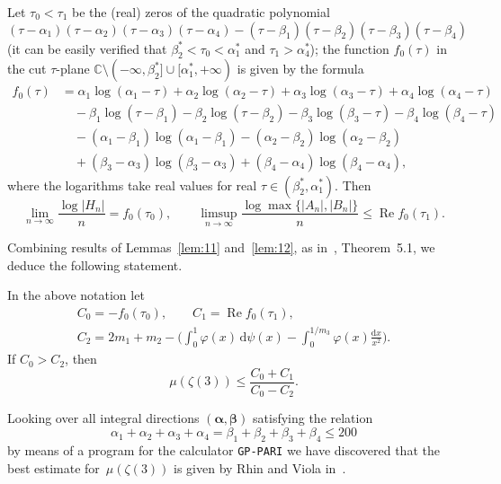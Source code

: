 \documentclass[a4paper,twoside]{article}
\numberwithin{equation}{section}
\renewcommand{\[}{\lfloor}
\renewcommand{\]}{\rfloor}
\newcommand{\<}{\langle}
\renewcommand{\>}{\rangle}
\renewcommand{\phi}{\varphi}
\renewcommand{\d}{\mathrm{d}}
\DeclareMathOperator{\Real}{Re}
\renewcommand{\Re}{\Real}
\newcommand{\rom}[1]{{\rm#1}}
\newcommand{\balpha}{\boldsymbol\alpha}
\newcommand{\bbeta}{\boldsymbol\beta}
\begin{document}
\begin{lemma}
\label{lem:12}
Let $\tau_0<\tau_1$ be the \rom(real\rom) zeros of the quadratic polynomial
$$
(\tau-\alpha_1)(\tau-\alpha_2)(\tau-\alpha_3)(\tau-\alpha_4)
-(\tau-\beta_1)(\tau-\beta_2)(\tau-\beta_3)(\tau-\beta_4)
$$
\rom(it can be easily verified that $\beta_2^*<\tau_0<\alpha_1^*$
and $\tau_1>\alpha_4^*$\rom)\rom;
the function $f_0(\tau)$ in the cut $\tau$-plane
$\mathbb C\setminus(-\infty,\beta_2^*]\cup[\alpha_1^*,+\infty)$
is given by the formula
\begin{align*}
f_0(\tau)
&=\alpha_1\log(\alpha_1-\tau)
+\alpha_2\log(\alpha_2-\tau)
+\alpha_3\log(\alpha_3-\tau)
+\alpha_4\log(\alpha_4-\tau)
\\ &\quad
-\beta_1\log(\tau-\beta_1)
-\beta_2\log(\tau-\beta_2)
-\beta_3\log(\beta_3-\tau)
-\beta_4\log(\beta_4-\tau)
\\ &\quad
-(\alpha_1-\beta_1)\log(\alpha_1-\beta_1)
-(\alpha_2-\beta_2)\log(\alpha_2-\beta_2)
\\ &\quad
+(\beta_3-\alpha_3)\log(\beta_3-\alpha_3)
+(\beta_4-\alpha_4)\log(\beta_4-\alpha_4),
\end{align*}
where the logarithms
take real values for real $\tau\in(\beta_2^*,\alpha_1^*)$.
Then
$$
\lim_{n\to\infty}\frac{\log|H_n|}n=f_0(\tau_0),
\qquad
\limsup_{n\to\infty}\frac{\log\max\{|A_n|,|B_n|\}}n
\le\Re f_0(\tau_1).
$$
\end{lemma}

Combining results of Lemmas~\ref{lem:11} and~\ref{lem:12},
as in~\cite{RV3}, Theorem~5.1,
we deduce the following statement.

\begin{proposition}
\label{prop:3}
In the above notation let
$$
\begin{gathered}
C_0=-f_0(\tau_0), \qquad C_1=\Re f_0(\tau_1),
\\
C_2=2m_1+m_2
-\biggl(\int_0^1\phi(x)\,\d\psi(x)
-\int_0^{1/m_3}\phi(x)\frac{\d x}{x^2}\biggr).
\end{gathered}
$$
If $C_0>C_2$\rom, then
$$
\mu(\zeta(3))\le\frac{C_0+C_1}{C_0-C_2}.
$$
\end{proposition}

Looking over all integral directions $(\balpha,\bbeta)$
satisfying the relation
\begin{equation}
\alpha_1+\alpha_2+\alpha_3+\alpha_4
=\beta_1+\beta_2+\beta_3+\beta_4
\le200
\label{eq:5.10}
\end{equation}
by means of a program for the calculator {\tt GP-PARI} we have
discovered that the best estimate for~$\mu(\zeta(3))$
is given by Rhin and Viola in~\cite{RV3}.
\end{document}
